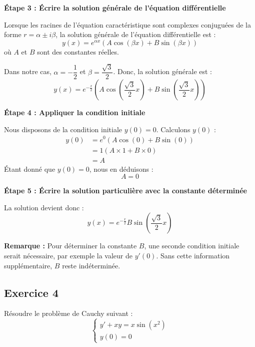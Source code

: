 \documentclass{article}
\begin{document}
\textbf{Étape 3 : Écrire la solution générale de l'équation différentielle}

Lorsque les racines de l'équation caractéristique sont complexes conjuguées de la forme \( r = \alpha \pm i\beta \), la solution générale de l'équation différentielle est :
\begin{equation*}
y(x) = e^{\alpha x} \left( A\cos(\beta x) + B\sin(\beta x) \right)
\end{equation*}
où \( A \) et \( B \) sont des constantes réelles.

Dans notre cas, \( \alpha = -\dfrac{1}{2} \) et \( \beta = \dfrac{\sqrt{3}}{2} \). Donc, la solution générale est :
\begin{equation*}
y(x) = e^{-\frac{x}{2}} \left( A\cos\left( \frac{\sqrt{3}}{2} x \right) + B\sin\left( \frac{\sqrt{3}}{2} x \right) \right)
\end{equation*}

\textbf{Étape 4 : Appliquer la condition initiale}

Nous disposons de la condition initiale \( y(0) = 0 \). Calculons \( y(0) \) :
\begin{align*}
y(0) &= e^{0} \left( A\cos\left( 0 \right) + B\sin\left( 0 \right) \right) \\
&= 1 \left( A \times 1 + B \times 0 \right) \\
&= A
\end{align*}
Étant donné que \( y(0) = 0 \), nous en déduisons :
\begin{equation*}
A = 0
\end{equation*}

\textbf{Étape 5 : Écrire la solution particulière avec la constante déterminée}

La solution devient donc :
\begin{equation*}
y(x) = e^{-\frac{x}{2}} B\sin\left( \frac{\sqrt{3}}{2} x \right)
\end{equation*}

\textbf{Remarque :} Pour déterminer la constante \( B \), une seconde condition initiale serait nécessaire, par exemple la valeur de \( y'(0) \). Sans cette information supplémentaire, \( B \) reste indéterminée.

\subsection{Exercice 4}
Résoudre le problème de Cauchy suivant :
\begin{equation*}
\begin{cases}
    y' + xy = x\sin(x^2) \\
    y(0)=0
\end{cases}
\end{equation*}
\end{document}
